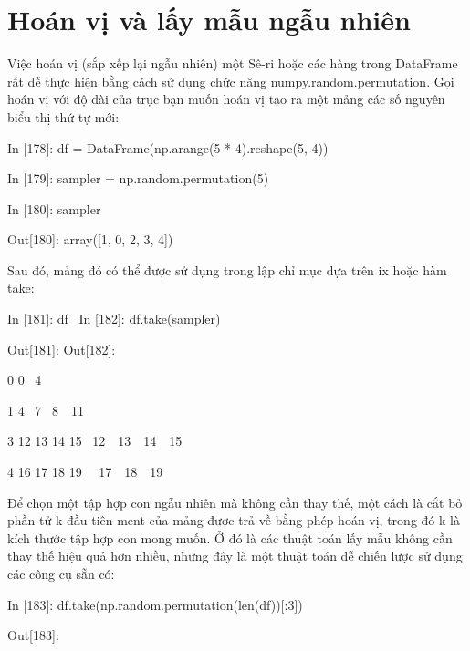 \section{Hoán vị và lấy mẫu ngẫu nhiên}
Việc hoán vị (sắp xếp lại ngẫu nhiên) một Sê-ri hoặc các hàng trong DataFrame rất dễ thực hiện bằng cách sử dụng 
chức năng numpy.random.permutation. Gọi hoán vị với độ dài của trục 
bạn muốn hoán vị tạo ra một mảng các số nguyên biểu thị thứ tự mới:\par
    \quad\textup{In [178]: df = DataFrame(np.arange(5 * 4).reshape(5, 4))   }\par
    \quad\textup{In [179]: sampler = np.random.permutation(5)  }\par
    \quad\textup{In [180]: sampler  }\par
    \quad\textup{Out[180]: array([1, 0, 2, 3, 4])}\par
Sau đó, mảng đó có thể được sử dụng trong lập chỉ mục dựa trên ix hoặc hàm take:\par
    \quad\textup{In [181]: df \quad\quad                \  In [182]: df.take(sampler)    }\par
    \quad\textup{Out[181]: \quad\quad\quad                  Out[182]:  }\par
    \quad\textup{ \quad\quad\quad\quad{}   }\par
    \quad\textup{0   0  \quad\quad{} \quad\   4 }\par
    \quad\textup{1  4  \  7  \quad\quad{}  \quad\  8\ \  11  }\par
    \quad\textup{3  12  13  14  15  \quad\quad{}\quad\    12\ \   13\ \   14\ \   15  }\par
    \quad\textup{4  16  17  18  19 \quad\quad{} \ \   17\ \   18\ \   19 }\par
Để chọn một tập hợp con ngẫu nhiên mà không cần thay thế, một cách là cắt bỏ phần tử k đầu tiên 
ment của mảng được trả về bằng phép hoán vị, trong đó k là kích thước tập hợp con mong muốn. Ở đó 
là các thuật toán lấy mẫu không cần thay thế hiệu quả hơn nhiều, nhưng đây là một thuật toán dễ 
chiến lược sử dụng các công cụ sẵn có:\par
    \quad\textup{In [183]: df.take(np.random.permutation(len(df))[:3])    }\par
    \quad\textup{Out[183]:  }\par
    \quad\textup{   }\par
